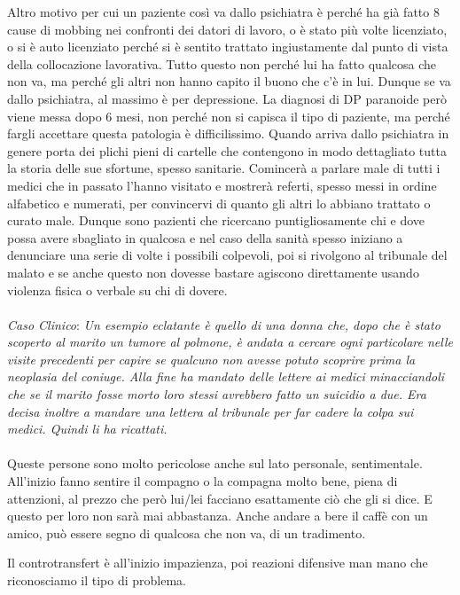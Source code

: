Altro motivo per cui un paziente così va dallo psichiatra è perché ha
già fatto 8 cause di mobbing nei confronti dei datori di lavoro, o è
stato più volte licenziato, o si è auto licenziato perché si è sentito
trattato ingiustamente dal punto di vista della collocazione lavorativa.
Tutto questo non perché lui ha fatto qualcosa che non va, ma perché gli
altri non hanno capito il buono che c'è in lui. Dunque se va dallo
psichiatra, al massimo è per depressione. La diagnosi di DP paranoide
però viene messa dopo 6 mesi, non perché non si capisca il tipo di
paziente, ma perché fargli accettare questa patologia è difficilissimo.
Quando arriva dallo psichiatra in genere porta dei plichi pieni di
cartelle che contengono in modo dettagliato tutta la storia delle sue
sfortune, spesso sanitarie. Comincerà a parlare male di tutti i medici
che in passato l'hanno visitato e mostrerà referti, spesso messi in
ordine alfabetico e numerati, per convincervi di quanto gli altri lo
abbiano trattato o curato male. Dunque sono pazienti che ricercano
puntigliosamente chi e dove possa avere sbagliato in qualcosa e nel caso
della sanità spesso iniziano a denunciare una serie di volte i possibili
colpevoli, poi si rivolgono al tribunale del malato e se anche questo
non dovesse bastare agiscono direttamente usando violenza fisica o
verbale su chi di dovere.
\\\\
\emph{Caso Clinico}: \emph{Un esempio eclatante è quello di una donna
che, dopo che è stato scoperto al marito un tumore al polmone, è andata
a cercare ogni particolare nelle visite precedenti per capire se
qualcuno non avesse potuto scoprire prima la neoplasia del coniuge. Alla
fine ha mandato delle lettere ai medici minacciandoli che se il marito
fosse morto loro stessi avrebbero fatto un suicidio a due. Era decisa
inoltre a mandare una lettera al tribunale per far cadere la colpa sui
medici. Quindi li ha ricattati.}
\\\\
Queste persone sono molto pericolose anche sul lato personale,
sentimentale. All'inizio fanno sentire il compagno o la compagna molto
bene, piena di attenzioni, al prezzo che però lui/lei facciano
esattamente ciò che gli si dice. E questo per loro non sarà mai
abbastanza. Anche andare a bere il caffè con un amico, può essere segno
di qualcosa che non va, di un tradimento.

Il controtransfert è all'inizio impazienza, poi reazioni difensive man
mano che riconosciamo il tipo di problema.


